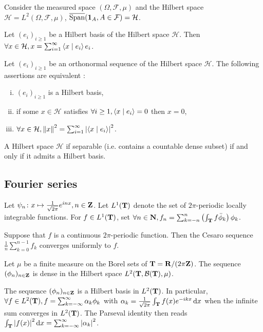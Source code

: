 \begin{pop}
	Consider the measured space $(\Omega, \mathcal{F}, \mu)$ and the Hilbert space $\mathcal{H} = L^2(\Omega, \mathcal{F}, \mu)$, $\overline{\operatorname{Span}}(\operatorname{\mathbf{1}}_A, A \in \mathcal{F}) = \mathcal{H}$.
\end{pop}

\begin{thm}
	Let $(e_i)_{i \geq 1}$ be a Hilbert basis of the Hilbert space $\mathcal{H}$.
	Then $\forall x \in \mathcal{H}, x = \sum_{i = 1}^\infty \left\langle x \mid e_i \right\rangle e_i$.
\end{thm}

\begin{thm}
	Let $(e_i)_{i \geq 1}$ be an orthonormal sequence of the Hilbert space $\mathcal{H}$.
	The following assertions are equivalent :
	\begin{enumerate}[(i)]
		\item $(e_i)_{i \geq 1}$ is a Hilbert basis,
		\item if some $x \in \mathcal{H}$ satisfies $\forall i \geq 1, \left\langle x \mid e_i \right\rangle = 0$ then $x = 0$,
		\item $\forall x \in \mathcal{H}, \left\lVert x\right\rVert^2 = \sum_{i = 1}^\infty \left\lvert\left\langle x \mid e_i \right\rangle\right\rvert^2$.
	\end{enumerate}
\end{thm}

\begin{thm}
	A Hilbert space $\mathcal{H}$ if separable (i.e. contains a countable dense subset) if and only if it admits a Hilbert basis.
\end{thm}

\subsection{Fourier series}

	Let $\psi_n \colon x \mapsto \frac{1}{\sqrt{2\pi}} e^{inx}, n \in \mathbf{Z}$.
	Let $L^1(\mathbf{T})$ denote the set of $2\pi$-periodic locally integrable functions.
	For $f \in L^1(\mathbf{T})$, set $\forall n \in \mathbf{N}, f_n = \sum_{k = -n}^n \left( \int_{\mathbf{T}} f \bar\phi_k \right) \phi_k$.

	\begin{thm}
		Suppose that $f$ is a continuous $2\pi$-periodic function.
		Then the Cesaro sequence $\frac{1}{n} \sum_{k = 0}^{n - 1} f_k$ converges uniformly to $f$.
	\end{thm}

	\begin{cor}
		Let $\mu$ be a finite measure on the Borel sets of $\mathbf{T} = \mathbf{R} / (2\pi\mathbf{Z})$.
		The sequence $(\phi_n)_{n \in \mathbf{Z}}$ is dense in the Hilbert space $L^2(\mathbf{T}, \mathcal{B}(\mathbf{T}), \mu)$.
	\end{cor}

	\begin{cor}
		The sequence $(\phi_n)_{n \in \mathbf{Z}}$ is a Hilbert basis in $L^2(\mathbf{T})$.
		In particular, $\forall f \in L^2(\mathbf{T}), f = \sum_{k = -\infty}^\infty \alpha_k \phi_k$ with $\alpha_k = \frac{1}{\sqrt{2\pi}} \int_{\mathbf{T}} f(x) e^{-ikx} \mathop{}\mathopen{}\mathrm{d} x$ when the infinite sum converges in $L^2(\mathbf{T})$.
		The Parseval identity then reads $\int_{\mathbf{T}} \left\lvert f(x)\right\rvert^2 \mathop{}\mathopen{}\mathrm{d} x = \sum_{k = -\infty}^\infty \left\lvert\alpha_k\right\rvert^2$.
	\end{cor}